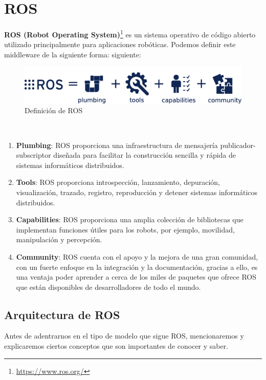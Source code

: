 \section{ROS}
\label{sec:ros}
\textbf{ROS (Robot Operating System)}\footnote{\url{https://www.ros.org/}} es un sistema operativo de código abierto utilizado principalmente para aplicaciones robóticas. 
Podemos definir este middleware de la siguiente forma:
siguiente:

\begin{figure} [H]
    \begin{center}
      \includegraphics[scale=0.18]{figs/Plataformas_Desarollo/ros-equation.png}
    \end{center}
    \caption{Definición de ROS}
    \label{fig:ROS}
  \end{figure}\


\begin{enumerate}
    \item \textbf{Plumbing}: ROS proporciona una infraestructura de mensajería publicador-subscriptor diseñada para facilitar la construcción sencilla y rápida de sistemas informáticos
    distribuidos.
    \item \textbf{Tools}: ROS proporciona introspección, lanzamiento, depuración, visualización, trazado, registro, reproducción y detener sistemas informáticos distribuidos.
    \item \textbf{Capabilities}: ROS proporciona una amplia colección de bibliotecas que implementan funciones útiles para los robots, por ejemplo, movilidad, manipulación y percepción.
    \item \textbf{Community}: ROS cuenta con el apoyo y la mejora de una gran comunidad, con un fuerte enfoque en la integración y la documentación, gracias a ello, es una ventaja poder
    aprender a cerca de los miles de paquetes que ofrece ROS que están disponibles de desarrolladores de todo el mundo.
\end{enumerate}

\subsection{Arquitectura de ROS}
\label{sec:arquitectura}
Antes de adentrarnos en el tipo de modelo que sigue ROS, mencionaremos y explicaremos ciertos conceptos que son importantes de conocer y saber.

